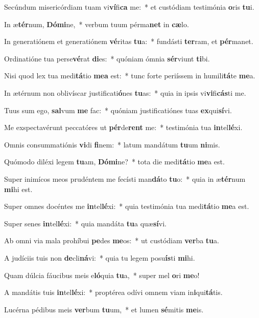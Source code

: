 \item Secúndum misericórdiam tuam vi\textbf{ví}fi\textbf{ca} me:~* et custódiam testimónia \textbf{o}ris \textbf{tu}i.
\item In æ\textbf{tér}num, \textbf{Dó}\textbf{mi}ne,~* verbum tuum pérma\textbf{net} in \textbf{cæ}lo.
\item In generatiónem et generatiónem \textbf{vé}ritas \textbf{tu}a:~* fundásti \textbf{ter}ram, et \textbf{pér}manet.
\item Ordinatióne tua perse\textbf{vé}rat \textbf{di}es:~* quóniam ómnia \textbf{sér}viunt \textbf{ti}bi.
\item Nisi quod lex tua medi\textbf{tá}tio \textbf{me}\textbf{a} est:~* tunc forte periíssem in humili\textbf{tá}te \textbf{me}a.
\item In ætérnum non oblivíscar justificati\textbf{ó}nes \textbf{tu}as:~* quia in ipsis vi\textbf{vi}fi\textbf{cás}ti me.
\item Tuus sum ego, \textbf{sal}vum \textbf{me} fac:~* quóniam justificatiónes tuas \textbf{ex}qui\textbf{sí}vi.
\item Me exspectavérunt peccatóres ut \textbf{pér}de\textbf{rent} me:~* testimónia tua \textbf{in}tel\textbf{lé}xi.
\item Omnis consummatiónis \textbf{vi}di \textbf{fi}nem:~* latum mandátum \textbf{tu}um \textbf{ni}mis.
\item Quómodo diléxi legem \textbf{tu}am, \textbf{Dó}\textbf{mi}ne?~* tota die medi\textbf{tá}tio \textbf{me}a est.
\item Super inimícos meos prudéntem me fecísti man\textbf{dá}to \textbf{tu}o:~* quia in æ\textbf{tér}num \textbf{mi}hi est.
\item Super omnes docéntes me \textbf{in}tel\textbf{lé}xi:~* quia testimónia tua medi\textbf{tá}tio \textbf{me}a est.
\item Super senes \textbf{in}tel\textbf{lé}xi:~* quia mandáta \textbf{tu}a quæ\textbf{sí}vi.
\item Ab omni via mala prohíbui \textbf{pe}des \textbf{me}os:~* ut custódiam \textbf{ver}ba \textbf{tu}a.
\item A judíciis tuis non \textbf{de}cli\textbf{ná}vi:~* quia tu legem posu\textbf{ís}ti \textbf{mi}hi.
\item Quam dúlcia fáucibus meis e\textbf{ló}quia \textbf{tu}a,~* super mel \textbf{o}ri \textbf{me}o!
\item A mandátis tuis \textbf{in}tel\textbf{lé}xi:~* proptérea odívi omnem viam in\textbf{i}qui\textbf{tá}tis.
\item Lucérna pédibus meis \textbf{ver}bum \textbf{tu}um,~* et lumen \textbf{sé}mitis \textbf{me}is.
